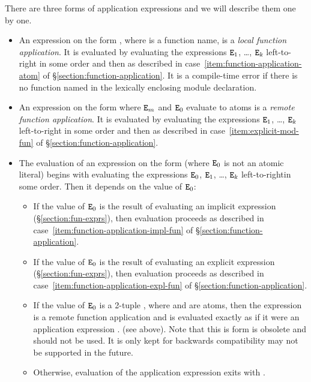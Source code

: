There are three forms of application expressions and we will describe
them one by one.
\begin{itemize}

\item An expression on the form
, where  is a
function name, is a
\emph{local function application}.
It is evaluated by evaluating the expressions ${\tt{\sl E}}_1$, \ldots,
${\tt{\sl E}}_{\mbox{\scriptsize\tt{\sl{k}}}}$
\ifStd left-to-right \fi \ifOld in some order \fi and then
as described in case~\ref{item:function-application-atom} of
\S\ref{section:function-application}.  It is a compile-time error if
there is no function named  in the lexically
enclosing module declaration.

\item An expression on the form
 where
${\tt{\sl E}}_m$ and ${\tt{\sl E}}_0$ evaluate to atoms is a
\emph{remote function application}.
It is evaluated by evaluating the expressions ${\tt{\sl E}}_1$, \ldots,
${\tt{\sl E}}_{\mbox{\scriptsize\tt{\sl{k}}}}$
\ifStd left-to-right \fi \ifOld in some order \fi and then
as described in case~\ref{item:explicit-mod-fun} of
\S\ref{section:function-application}.

\item The evaluation of an expression on the form  (where
${\tt{\sl E}}_0$ is not an atomic literal) begins with
evaluating the expressions ${\tt{\sl E}}_0$, ${\tt{\sl E}}_1$, \ldots, ${\tt{\sl E}}_{\mbox{\scriptsize\tt{\sl{k}}}}$
\ifStd left-to-right\fi \ifOld in some order\fi.
Then it depends on the value of ${\tt{\sl E}}_0$:
\begin{itemize}

\item If the value of ${\tt{\sl E}}_0$ is the result of evaluating an
implicit  expression (\S\ref{section:fun-exprs}), then
evaluation proceeds as described in
case~\ref{item:function-application-impl-fun} of
\S\ref{section:function-application}.

\item If the value of ${\tt{\sl E}}_0$ is the result of evaluating an
explicit  expression (\S\ref{section:fun-exprs}), then
evaluation proceeds as described in
case~\ref{item:function-application-expl-fun} of
\S\ref{section:function-application}.

\item If the value of ${\tt{\sl E}}_0$ is a 2-tuple ,
where  and  are atoms, then the expression is a remote
function application and is evaluated exactly as if it were an
application expression
.
(see above).  Note that this is form is obsolete and should not be
used.  It is only kept for backwards compatibility may not be
supported in the future.

\item Otherwise, evaluation of the application expression exits with
.
\end{itemize}

\end{itemize}

